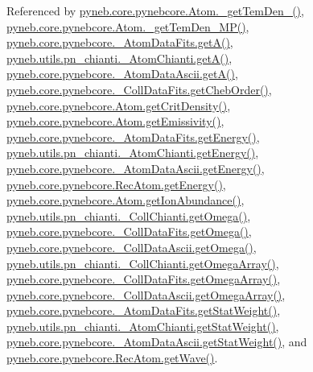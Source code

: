 Referenced by \hyperlink{pynebcore_8py_source_l01869}{pyneb.\-core.\-pynebcore.\-Atom.\-\_\-get\-Tem\-Den\-\_()}, \hyperlink{pynebcore_8py_source_l02046}{pyneb.\-core.\-pynebcore.\-Atom.\-\_\-get\-Tem\-Den\-\_\-\-M\-P()}, \hyperlink{pynebcore_8py_source_l00212}{pyneb.\-core.\-pynebcore.\-\_\-\-Atom\-Data\-Fits.\-get\-A()}, \hyperlink{pn__chianti_8py_source_l00316}{pyneb.\-utils.\-pn\-\_\-chianti.\-\_\-\-Atom\-Chianti.\-get\-A()}, \hyperlink{pynebcore_8py_source_l00487}{pyneb.\-core.\-pynebcore.\-\_\-\-Atom\-Data\-Ascii.\-get\-A()}, \hyperlink{pynebcore_8py_source_l00711}{pyneb.\-core.\-pynebcore.\-\_\-\-Coll\-Data\-Fits.\-get\-Cheb\-Order()}, \hyperlink{pynebcore_8py_source_l01759}{pyneb.\-core.\-pynebcore.\-Atom.\-get\-Crit\-Density()}, \hyperlink{pynebcore_8py_source_l01782}{pyneb.\-core.\-pynebcore.\-Atom.\-get\-Emissivity()}, \hyperlink{pynebcore_8py_source_l00275}{pyneb.\-core.\-pynebcore.\-\_\-\-Atom\-Data\-Fits.\-get\-Energy()}, \hyperlink{pn__chianti_8py_source_l00366}{pyneb.\-utils.\-pn\-\_\-chianti.\-\_\-\-Atom\-Chianti.\-get\-Energy()}, \hyperlink{pynebcore_8py_source_l00537}{pyneb.\-core.\-pynebcore.\-\_\-\-Atom\-Data\-Ascii.\-get\-Energy()}, \hyperlink{pynebcore_8py_source_l02927}{pyneb.\-core.\-pynebcore.\-Rec\-Atom.\-get\-Energy()}, \hyperlink{pynebcore_8py_source_l02176}{pyneb.\-core.\-pynebcore.\-Atom.\-get\-Ion\-Abundance()}, \hyperlink{pn__chianti_8py_source_l00507}{pyneb.\-utils.\-pn\-\_\-chianti.\-\_\-\-Coll\-Chianti.\-get\-Omega()}, \hyperlink{pynebcore_8py_source_l00828}{pyneb.\-core.\-pynebcore.\-\_\-\-Coll\-Data\-Fits.\-get\-Omega()}, \hyperlink{pynebcore_8py_source_l01082}{pyneb.\-core.\-pynebcore.\-\_\-\-Coll\-Data\-Ascii.\-get\-Omega()}, \hyperlink{pn__chianti_8py_source_l00484}{pyneb.\-utils.\-pn\-\_\-chianti.\-\_\-\-Coll\-Chianti.\-get\-Omega\-Array()}, \hyperlink{pynebcore_8py_source_l00800}{pyneb.\-core.\-pynebcore.\-\_\-\-Coll\-Data\-Fits.\-get\-Omega\-Array()}, \hyperlink{pynebcore_8py_source_l01058}{pyneb.\-core.\-pynebcore.\-\_\-\-Coll\-Data\-Ascii.\-get\-Omega\-Array()}, \hyperlink{pynebcore_8py_source_l00249}{pyneb.\-core.\-pynebcore.\-\_\-\-Atom\-Data\-Fits.\-get\-Stat\-Weight()}, \hyperlink{pn__chianti_8py_source_l00343}{pyneb.\-utils.\-pn\-\_\-chianti.\-\_\-\-Atom\-Chianti.\-get\-Stat\-Weight()}, \hyperlink{pynebcore_8py_source_l00514}{pyneb.\-core.\-pynebcore.\-\_\-\-Atom\-Data\-Ascii.\-get\-Stat\-Weight()}, and \hyperlink{pynebcore_8py_source_l02699}{pyneb.\-core.\-pynebcore.\-Rec\-Atom.\-get\-Wave()}.


